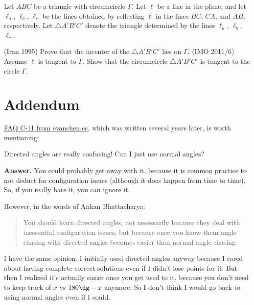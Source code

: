 \documentclass[11pt]{scrartcl}
\begin{document}
\begin{problem}
  Let $ABC$ be a triangle with circumcircle $\Gamma$.
  Let $\ell$ be a line in the plane, and let $\ell_a$, $\ell_b$, $\ell_c$ be the lines obtained
  by reflecting $\ell$ in the lines $BC$, $CA$, and $AB$, respectively.
  Let $\triangle A'B'C'$ denote the triangle determined by the lines $\ell_a$, $\ell_b$, $\ell_c$.
  \begin{enumerate}[(a)]
    \ii (Iran 1995) Prove that the incenter of the $\triangle A'B'C'$ lies on $\Gamma$.
    \ii (IMO 2011/6) Assume $\ell$ is tangent to $\Gamma$.
    Show that the circumcircle $\triangle A'B'C'$ is tangent to the circle $\Gamma$.
  \end{enumerate}
\end{problem}

\newpage
\appendix
\section{Addendum}
\href{https://web.evanchen.cc/faq-contest.html#C-11}{FAQ C-11 from evanchen.cc},
which was written several years later, is worth mentioning:

\begin{ques*}
Directed angles are really confusing! Can I just use normal angles?
\end{ques*}

\noindent\textbf{Answer.}
You could probably get away with it,
because it is common practice to not deduct for configuration issues
(although it does happen from time to time).
So, if you really hate it, you can ignore it.

However, in the words of Ankan Bhattacharya:
\begin{quote}
You should learn directed angles,
not necessarily because they deal with inessential configuration issues,
but because once you know them angle chasing with directed angles
becomes easier than normal angle chasing.
\end{quote}

I have the same opinion.
I initially used directed angles anyway because I cared about having
complete correct solutions even if I didn't lose points for it.
But then I realized it's actually easier once you get used to it,
because you don't need to keep track of $x$ vs $180\dg-x$ anymore.
So I don't think I would go back to using normal angles even if I could.
\end{document}
